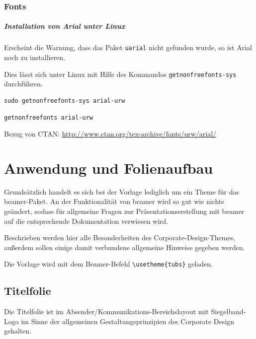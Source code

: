 \documentclass[cmyk,a4paper,colorscheme=green,TUBStitlepage=picture]{tubsreprt}
\begin{document}
\subsection{}

\subsection{Fonts}

\paragraph{Installation von Arial unter Linux}

Erscheint die Warnung, dass das Paket \lstinline{uarial} nicht gefunden wurde,
so ist Arial noch zu installieren.

Dies lässt sich unter Linux mit Hilfe des Kommandos
\lstinline{getnonfreefonts-sys} durchführen.

\begin{lstlisting}
sudo getnonfreefonts-sys arial-urw
\end{lstlisting}

\begin{lstlisting}
getnonfreefonts arial-urw
\end{lstlisting}

Bezug von CTAN: \url{http://www.ctan.org/tex-archive/fonts/urw/arial/}


\chapter{Anwendung und Folienaufbau}

Grundsätzlich handelt es sich bei der Vorlage lediglich um ein Theme für
das beamer-Paket. An der Funktionalität von beamer wird so gut wie nichts
geändert, sodass für allgemeine Fragen zur Präsentationserstellung mit beamer
auf die entsprechende Dokumentation verwiesen wird. %

Beschrieben werden hier alle Besonderheiten des Corporate-Design-Themes, außerdem sollen
einige damit verbundene allgemeine Hinweise gegeben werden.

Die Vorlage wird mit dem Beamer-Befehl \lstinline!\usetheme{tubs}! geladen.

\section{Titelfolie}

Die Titelfolie ist im Absender/Kommunikations-Bereichslayout mit
Siegelband-Logo im Sinne der allgemeinen Gestaltungsprinzipien des
Corporate Design gehalten.
\end{document}
